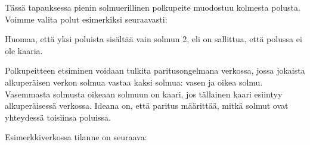 Tässä tapauksessa pienin solmuerillinen polkupeite
muodostuu kolmesta polusta.
Voimme valita polut esimerkiksi seuraavasti:

\begin{center}
\end{center}

Huomaa, että yksi poluista sisältää vain solmun 2,
eli on sallittua, että polussa ei ole kaaria.

Polkupeitteen etsiminen voidaan tulkita paritusongelmana
verkossa, jossa jokaista alkuperäisen verkon solmua
vastaa kaksi solmua: vasen ja oikea solmu.
Vasemmasta solmusta oikeaan solmuun on kaari,
jos tällainen kaari esiintyy alkuperäisessä verkossa.
Ideana on, että paritus määrittää, mitkä solmut
ovat yhteydessä toisiinsa poluissa.

Esimerkkiverkossa tilanne on seuraava:

